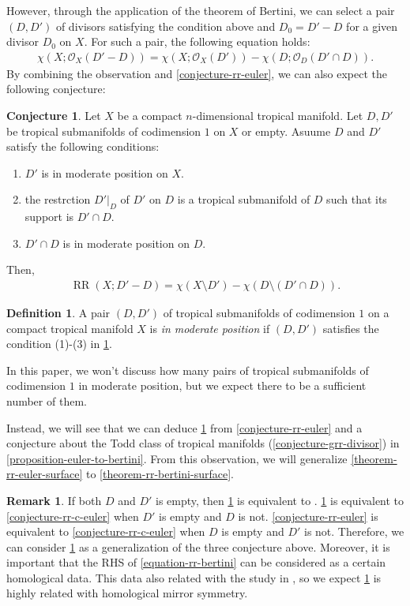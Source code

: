 \documentclass[a4paper,dvipdfmx,reqno,12pt]{amsart}
\theoremstyle{definition}
\newtheorem{definition}[theorem]{Definition}
\newtheorem{conjecture}[theorem]{Conjecture}
\newtheorem{remark}[theorem]{Remark}
\newcommand{\opn}[1]{\operatorname{#1}}
\numberwithin{equation}{section}
\begin{document}
However, through the application of the theorem of
Bertini, we can select a pair $(D,D')$ of divisors 
satisfying the condition above 
and $D_0=D'-D$ for a given divisor $D_0$ on $X$.
For such a pair, the following equation holds:
\begin{align}
\chi(X;\mathcal{O}_X(D'-D))=
\chi(X;\mathcal{O}_X(D'))-
\chi(D;\mathcal{O}_D(D'\cap D)).
\end{align}
By combining the observation and \cref{conjecture-rr-euler}, 
we can also expect the following conjecture:
\begin{conjecture}
\label{conjecture-rr-bertini}
Let $X$ be a compact $n$-dimensional
tropical manifold. 
Let $D,D'$ be tropical submanifolds of codimension $1$
on $X$ or empty.
Asuume $D$ and $D'$ satisfy the following conditions:
\begin{enumerate}
\item $D'$ is in moderate position on $X$.
\item the restrction $D'|_{D}$ of $D'$ on $D$ is 
a tropical submanifold of $D$ such that its support is   
$D'\cap D$.
\item $D'\cap D$ is in moderate position on $D$.
\end{enumerate}
Then,
\begin{align}
\label{equation-rr-bertini}
\opn{RR}(X;D'-D)=\chi (X\setminus D')-
\chi(D\setminus (D'\cap D)).
\end{align}

\end{conjecture}

\begin{definition}
A pair $(D,D')$ of tropical submanifolds of codimension 
$1$ on a compact tropical manifold $X$ is 
\emph{in moderate position} if $(D,D')$ satisfies
the condition (1)-(3) in \cref{conjecture-rr-bertini}.
\end{definition}
In this paper, we won't discuss how many pairs of 
tropical submanifolds of codimension $1$ in moderate position,
but we expect there to be a sufficient number of them.

Instead, we will see that we can deduce
\cref{conjecture-rr-bertini} from 
\cref{conjecture-rr-euler} and 
a conjecture about the Todd class of tropical 
manifolds (\cref{conjecture-grr-divisor})
in \cref{proposition-euler-to-bertini}.
From this observation, we will
generalize \cref{theorem-rr-euler-surface}
to \cref{theorem-rr-bertini-surface}.
\begin{remark}
If both $D$ and $D'$ is empty, then
\cref{conjecture-rr-bertini} is equivalent to
\cite[Conjecture 6.13]{demedrano2023chern}.
\cref{conjecture-rr-bertini} is equivalent to
\cref{conjecture-rr-c-euler} when 
$D'$ is empty and $D$ is not.
\cref{conjecture-rr-euler} is 
equivalent to
\cref{conjecture-rr-c-euler} when 
$D$ is empty and $D'$ is not.
Therefore, we can consider 
\cref{conjecture-rr-bertini} as a generalization
of the three conjecture above.
Moreover, it is important that 
the RHS of \eqref{equation-rr-bertini} 
can be considered as a certain homological data.
This data also related with the study in 
\cite{tsutsui2023graded}, so we expect 
\cref{conjecture-rr-bertini} is highly related
with homological mirror symmetry.
\end{remark}
\end{document}
